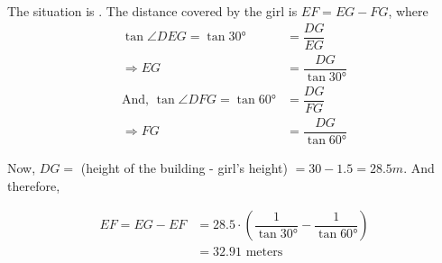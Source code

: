 \begin{solution}
	The situation is \asif. The distance covered by the girl is $EF = EG - FG$, where
	\begin{align}
		\tan\angle{DEG} = \tan\ang{30} &= \dfrac{DG}{EG} \\
		\Rightarrow EG &= \dfrac{DG}{\tan\ang{30}} \\
		\text{And, }\tan\angle{DFG} = \tan\ang{60} &= \dfrac{DG}{FG} \\
		\Rightarrow FG &= \dfrac{DG}{\tan\ang{60}}
	\end{align}
	
	Now, $DG =$ (height of the building - girl's height) $= 30 - 1.5 = 28.5m$. And therefore, 
	
	\begin{align}
		EF = EG - EF &= 28.5\cdot\left(\dfrac{1}{\tan\ang{30}} - \dfrac{1}{\tan\ang{60}}\right) \\
		&= 32.91 \text{ meters}
	\end{align}
	
\end{solution}

